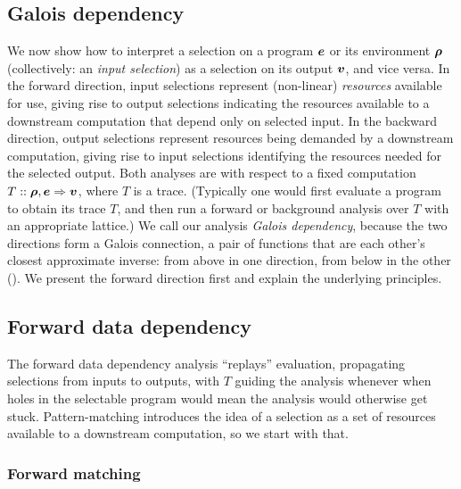 \subsection{Galois dependency}
\label{sec:data-dependencies:analyses}

We now show how to interpret a selection on a program $\bm{e}$ or its environment $\bm{\rho}$ (collectively: an \emph{input selection}) as a selection on its output $\bm{v}$, and vice versa. In the forward direction, input selections represent (non-linear) \emph{resources} available for use, giving rise to output selections indicating the resources available to a downstream computation that depend only on selected input. In the backward direction, output selections represent resources being demanded by a downstream computation, giving rise to input selections identifying the resources needed for the selected output. Both analyses are with respect to a fixed computation $T :: \bm{\rho}, \bm{e} \Rightarrow \bm{v}$, where $T$ is a trace. (Typically one would first evaluate a program to obtain its trace $T$, and then run a forward or background analysis over $T$ with an appropriate lattice.) We call our analysis \emph{Galois dependency}, because the two directions form a Galois connection, a pair of functions that are each other's closest approximate inverse: from above in one direction, from below in the other ().  We present the forward direction first and explain the underlying principles.

\subsection{Forward data dependency}
\label{sec:data-dependencies:analyses:fwd}

The forward data dependency analysis ``replays'' evaluation, propagating selections from inputs to outputs, with $T$ guiding the analysis whenever when holes in the selectable program would mean the analysis would otherwise get stuck. Pattern-matching introduces the idea of a selection as a set of resources available to a downstream computation, so we start with that.



\subsubsection{Forward matching}
\label{sec:data-dependencies:analyses:fwd:pattern-match}


